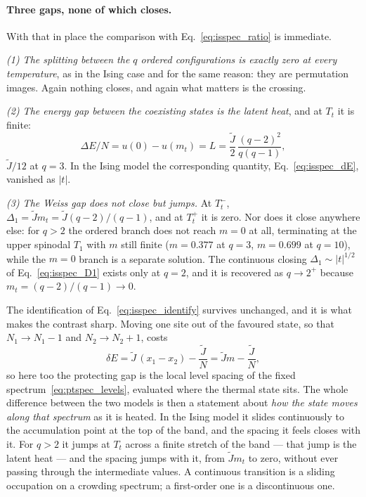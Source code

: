 \documentclass[10pt,a4paper]{article}
\theoremstyle{remark}
\begin{document}
\paragraph{Three gaps, none of which closes.} With that in place the comparison
with Eq.~\eqref{eq:isspec_ratio} is immediate.

\emph{(1) The splitting between the $q$ ordered configurations is exactly zero at
every temperature}, as in the Ising case and for the same reason: they are
permutation images. Again nothing closes, and again what matters is the crossing.

\emph{(2) The energy gap between the coexisting states is the latent heat}, and
at $T_t$ it is finite:
\begin{equation}\label{eq:ptspec_L}
\Delta E/N=u(0)-u(m_t)=L=\frac{\tilde J}{2}\,\frac{(q-2)^{2}}{q(q-1)} ,
\end{equation}
$\tilde J/12$ at $q=3$. In the Ising model the corresponding quantity,
Eq.~\eqref{eq:isspec_dE}, vanished as $|t|$.

\emph{(3) The Weiss gap does not close but jumps.} At $T_t^{-}$,
$\Delta_1=\tilde J m_t=\tilde J(q-2)/(q-1)$, and at $T_t^{+}$ it is zero. Nor
does it close anywhere else: for $q>2$ the ordered branch does not reach $m=0$
at all, terminating at the upper spinodal $T_1$ with $m$ still finite
($m=0.377$ at $q=3$, $m=0.699$ at $q=10$), while the
$m=0$ branch is a separate solution. The continuous closing
$\Delta_1\sim|t|^{1/2}$ of Eq.~\eqref{eq:isspec_D1} exists only at $q=2$, and it
is recovered as $q\to2^{+}$ because $m_t=(q-2)/(q-1)\to0$.

The identification of Eq.~\eqref{eq:isspec_identify} survives unchanged, and it
is what makes the contrast sharp. Moving one site out of the favoured state, so
that $N_1\to N_1-1$ and $N_2\to N_2+1$, costs
\begin{equation}\label{eq:ptspec_flip}
\delta E=\tilde J\,(x_1-x_2)-\frac{\tilde J}{N}=\tilde J m-\frac{\tilde J}{N} ,
\end{equation}
so here too the protecting gap is the local level spacing of the fixed
spectrum~\eqref{eq:ptspec_levels}, evaluated where the thermal state sits. The
whole difference between the two models is then a statement about \emph{how the
state moves along that spectrum} as it is heated. In the Ising model it slides
continuously to the accumulation point at the top of the band, and the spacing it
feels closes with it. For $q>2$ it jumps at $T_t$ across a finite stretch of the
band --- that jump is the latent heat --- and the spacing jumps with it, from
$\tilde J m_t$ to zero, without ever passing through the intermediate values. A
continuous transition is a sliding occupation on a crowding spectrum; a
first-order one is a discontinuous one.
\end{document}
